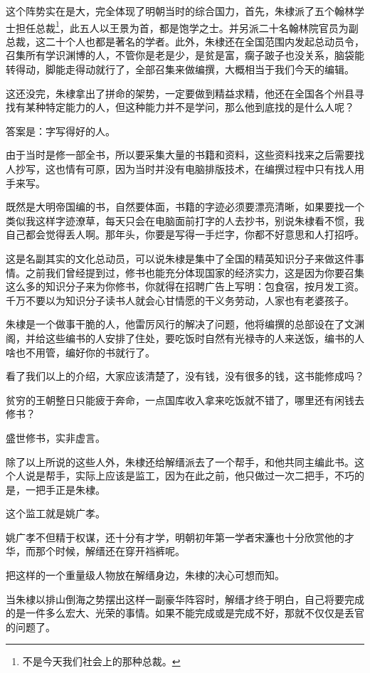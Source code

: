 \begin{multicols}{\theparacolNo}
这个阵势实在是大，完全体现了明朝当时的综合国力，首先，朱棣派了五个翰林学士担任总裁\footnote{不是今天我们社会上的那种总裁。}，此五人以王景为首，都是饱学之士。并另派二十名翰林院官员为副总裁，这二十个人也都是著名的学者。此外，朱棣还在全国范围内发起总动员令，召集所有学识渊博的人，不管你是老是少，是贫是富，瘸子跛子也没关系，脑袋能转得动，脚能走得动就行了，全部召集来做编撰，大概相当于我们今天的编辑。

这还没完，朱棣拿出了拼命的架势，一定要做到精益求精，他还在全国各个州县寻找有某种特定能力的人，但这种能力并不是学问，那么他到底找的是什么人呢？

答案是：字写得好的人。

由于当时是修一部全书，所以要采集大量的书籍和资料，这些资料找来之后需要找人抄写，这也情有可原，因为当时并没有电脑排版技术，在编撰过程中只有找人用手来写。

既然是大明帝国编的书，自然要体面，书籍的字迹必须要漂亮清晰，如果要找一个类似我这样字迹潦草，每天只会在电脑面前打字的人去抄书，别说朱棣看不惯，我自己都会觉得丢人啊。那年头，你要是写得一手烂字，你都不好意思和人打招呼。

这是名副其实的文化总动员，可以说朱棣是集中了全国的精英知识分子来做这件事情。之前我们曾经提到过，修书也能充分体现国家的经济实力，这是因为你要召集这么多的知识分子来为你修书，你就得在招聘广告上写明：包食宿，按月发工资。千万不要以为知识分子读书人就会心甘情愿的干义务劳动，人家也有老婆孩子。

朱棣是一个做事干脆的人，他雷厉风行的解决了问题，他将编撰的总部设在了文渊阁，并给这些编书的人安排了住处，要吃饭时自然有光禄寺的人来送饭，编书的人啥也不用管，编好你的书就行了。

看了我们以上的介绍，大家应该清楚了，没有钱，没有很多的钱，这书能修成吗？

贫穷的王朝整日只能疲于奔命，一点国库收入拿来吃饭就不错了，哪里还有闲钱去修书？

盛世修书，实非虚言。

除了以上所说的这些人外，朱棣还给解缙派去了一个帮手，和他共同主编此书。这个人说是帮手，实际上应该是监工，因为在此之前，他只做过一次二把手，不巧的是，一把手正是朱棣。

这个监工就是姚广孝。

姚广孝不但精于权谋，还十分有才学，明朝初年第一学者宋濂也十分欣赏他的才华，而那个时候，解缙还在穿开裆裤呢。

把这样的一个重量级人物放在解缙身边，朱棣的决心可想而知。

当朱棣以排山倒海之势摆出这样一副豪华阵容时，解缙才终于明白，自己将要完成的是一件多么宏大、光荣的事情。如果不能完成或是完成不好，那就不仅仅是丢官的问题了。


\end{multicols}
